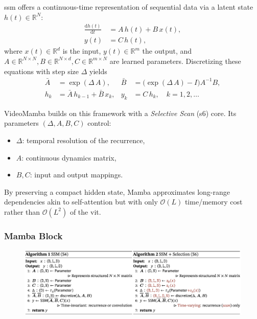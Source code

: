 \acrfull{ssm} offers a continuous-time representation of sequential data via a latent state \(h(t)\in\mathbb{R}^N\):
\begin{align}
    \frac{\mathrm{d}h(t)}{\mathrm{d}t} &= A\,h(t) + B\,x(t),  \label{eq:ssm_continuous1}\\
    y(t) &= C\,h(t),                                    \label{eq:ssm_continuous2}
\end{align}
where \(x(t)\in\mathbb{R}^d\) is the input, \(y(t)\in\mathbb{R}^m\) the output, and \(A\in\mathbb{R}^{N\times N}, B\in\mathbb{R}^{N\times d}, C\in\mathbb{R}^{m\times N}\) are learned parameters.  Discretizing these equations with step size \(\Delta\) yields
\begin{align}
    \bar A &= \exp(\Delta\,A), 
    & 
    \bar B &= \bigl(\exp(\Delta\,A)-I\bigr)A^{-1}B,\\
    h_k &= \bar A\,h_{k-1} + \bar B\,x_k, 
    &
    y_k &= C\,h_k,
    \quad k=1,2,\dots
\end{align}

VideoMamba \cite{li_videomamba_2024} builds on this framework with a \emph{Selective Scan} (\acrshort{s6}) core. Its parameters \((\Delta, A,B,C)\) control:
\begin{itemize}
    \item \(\Delta\): temporal resolution of the recurrence,
    \item \(A\): continuous dynamics matrix,
    \item \(B,C\): input and output mappings.
\end{itemize}

By preserving a compact hidden state, Mamba approximates long-range dependencies akin to self-attention but with only \(\mathcal{O}(L)\) time/memory cost rather than \(\mathcal{O}(L^2)\) of the \acrfull{vit}.  


\subsubsection{Mamba Block}

\begin{figure}[h]
    \centering
    \includegraphics[width=1\linewidth]{figures/mamba_algorithm.png}
\end{figure}

